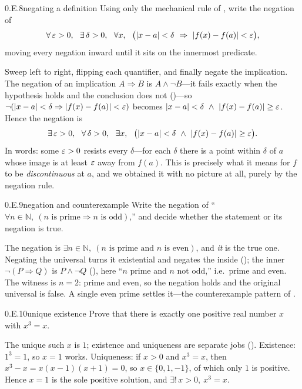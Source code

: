 \documentclass[main.tex]{subfiles}
\begin{document}
\begin{Exercise}{0.E.8}{negating a definition}
Using only the mechanical rule of , write the negation of
\[
\forall\,\eps>0,\ \ \exists\,\delta>0,\ \ \forall x,\ \ \bigl(|x-a|<\delta\ \Rightarrow\
|f(x)-f(a)|<\eps\bigr),
\]
moving every negation inward until it sits on the innermost predicate.
\end{Exercise}
\begin{Solution}
Sweep left to right, flipping each quantifier, and finally negate the implication. The negation of an
implication $A\Rightarrow B$ is $A\wedge\neg B$---it fails exactly when the hypothesis holds and the
conclusion does not (\xref{0.1.5})---so $\neg(|x-a|<\delta\Rightarrow|f(x)-f(a)|<\varepsilon)$ becomes
$|x-a|<\delta\ \wedge\ |f(x)-f(a)|\ge\eps$. Hence the negation is
\[
\exists\,\eps>0,\ \ \forall\,\delta>0,\ \ \exists x,\ \ \bigl(|x-a|<\delta\ \wedge\
|f(x)-f(a)|\ge\eps\bigr).
\]
In words: some $\varepsilon>0$ resists every $\delta$---for each $\delta$ there is a point within $\delta$ of
$a$ whose image is at least $\varepsilon$ away from $f(a)$. This is precisely what it means for $f$ to be
\emph{discontinuous} at $a$, and we obtained it with no picture at all, purely by the negation rule.
\end{Solution}

\begin{Exercise}{0.E.9}{negation and counterexample}
Write the negation of ``$\forall n\in\mathbb N,\ (n\text{ is prime}\Rightarrow n\text{ is odd})$,''
and decide whether the statement or its negation is true.
\end{Exercise}
\begin{Solution}
The negation is $\exists n\in\mathbb N,\ (n\text{ is prime and }n\text{ is even})$, and \emph{it} is
the true one. Negating the universal turns it existential and negates the inside (); the
inner $\neg(P\Rightarrow Q)$ is $P\wedge\neg Q$ (\xref{0.1.5}), here ``$n$ prime and $n$ not odd,''
i.e.\ prime and even. The witness is $n=2$: prime and even, so the negation holds and the original
universal is false. A single even prime settles it---the counterexample pattern of \xref{0.2.4}.
\end{Solution}

\begin{Exercise}{0.E.10}{unique existence}
Prove that there is exactly one positive real number $x$ with $x^{3}=x$.
\end{Exercise}
\begin{Solution}
The unique such $x$ is $1$; existence and uniqueness are separate jobs (). Existence:
$1^{3}=1$, so $x=1$ works. Uniqueness: if $x>0$ and $x^{3}=x$, then $x^{3}-x=x(x-1)(x+1)=0$, so
$x\in\{0,1,-1\}$, of which only $1$ is positive. Hence $x=1$ is the sole positive solution, and
$\exists!\,x>0,\ x^{3}=x$.
\end{Solution}
\end{document}
